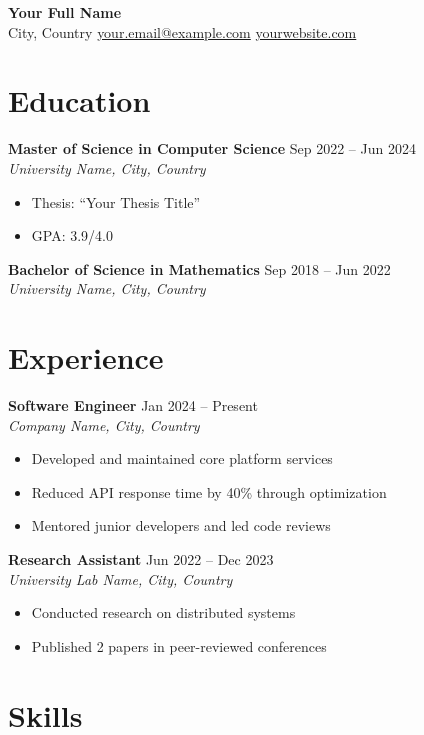 \documentclass[11pt]{article}
\begin{document}
\begin{center}
  {\LARGE\bfseries Your Full Name} \\[6pt]
  City, Country \quad
  \href{mailto:your.email@example.com}{your.email@example.com} \quad
  \href{https://yourwebsite.com}{yourwebsite.com}
\end{center}

\section*{Education}

\textbf{Master of Science in Computer Science} \hfill Sep 2022 -- Jun 2024 \\
\textit{University Name, City, Country}
\begin{itemize}
  \item Thesis: ``Your Thesis Title''
  \item GPA: 3.9/4.0
\end{itemize}

\textbf{Bachelor of Science in Mathematics} \hfill Sep 2018 -- Jun 2022 \\
\textit{University Name, City, Country}

\section*{Experience}

\textbf{Software Engineer} \hfill Jan 2024 -- Present \\
\textit{Company Name, City, Country}
\begin{itemize}
  \item Developed and maintained core platform services
  \item Reduced API response time by 40\% through optimization
  \item Mentored junior developers and led code reviews
\end{itemize}

\textbf{Research Assistant} \hfill Jun 2022 -- Dec 2023 \\
\textit{University Lab Name, City, Country}
\begin{itemize}
  \item Conducted research on distributed systems
  \item Published 2 papers in peer-reviewed conferences
\end{itemize}

\section*{Skills}
\end{document}
